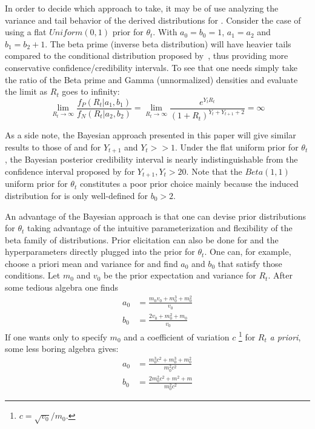 In order to decide which approach to take, it may be of use analyzing the 
variance and tail behavior of the derived distributions for \rr. 
Consider the case of using a flat $Uniform(0, 1)$ prior for $\theta_t$.
With $a_0 = b_0 = 1$, $a_1 = a_2$ and $b_1 = b_2 + 1$.
The beta prime (inverse beta distribution) will have heavier tails compared to 
the conditional distribution proposed by~\cite{nishiura}, thus providing more 
conservative confidence/credibility intervals.
To see that one needs simply take the ratio of the Beta prime and Gamma 
(unnormalized) densities and evaluate the limit as $R_t$ goes to infinity:
\begin{equation}
 \label{seq:densityratio}
 \lim_{R_t\to\infty}\frac{f_P(R_t| a_1, b_1)}{f_N(R_t| a_2, b_2)} =  
\lim_{R_t\to\infty}\frac{e^{Y_{t}R_t}}{(1 +R_t)^{Y_{t} + Y_{t +1}+2}} = \infty
\end{equation}



As a side note, the Bayesian approach presented in this 
paper will give similar results to those of 
\cite{wilson} and \cite{clopper} for $Y_{t+1}$ and $Y_t >> 1$.
Under the flat  uniform prior for $\theta_t$, the Bayesian posterior 
credibility 
interval is nearly indistinguishable from the confidence interval proposed by 
\cite{clopper} for $Y_{t+1}, Y_t > 20$.
Note that the $Beta(1, 1)$ uniform prior for $\theta_t$ constitutes a poor 
prior 
choice mainly because the induced distribution for \rr is only well-defined for 
$b_0 > 2$.

An advantage of the Bayesian approach is that one can devise prior 
distributions for $\theta_t$ taking advantage of the intuitive parameterization 
and flexibility of the beta family of distributions.
Prior elicitation can also be done for \rr and the hyperparameters directly 
plugged into the prior for $\theta_t$. 
One can, for example, choose a priori mean and variance for \rr and find $a_0$ 
and $b_0$ that satisfy those conditions.
Let $m_0$ and $v_0$ be the prior expectation and variance for $R_t$. 
After some tedious algebra one finds
\begin{align}
\label{seq:elicitation}
a_0 &= \frac{m_0v_0 + m_0^3 + m_0^2}{v_0} \\
b_0 &= \frac{2v_0 + m_0^2 + m_0}{v_0}
\end{align}
If one wants only to specify $m_0$ and a coefficient of variation $c$ 
\footnote{$c = \sqrt{v_0}/ m_0$.} for $R_t$ \textit{a priori}, some less boring 
algebra gives:
\begin{align}
\label{seq:elicitationcv}
a_0 &= \frac{m_0^3c^2 + m_0^3 + m_0^2}{m_0^2c^2} \\
b_0 &= \frac{2m_0^2c^2 + m^2 + m}{m_0^2c^2}
\end{align}

